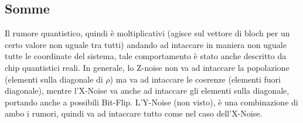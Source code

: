 \subsection{Somme}
Il rumore quantistico, quindi è moltiplicativi (agisce sul vettore di bloch per un certo valore non uguale tra tutti) andando ad intaccare in maniera non uguale tutte le coordinate del sistema, tale comportamento è stato anche descritto da chip quantistici reali.
In generale, lo Z-noise non va ad intaccare la popolazione (elementi sulla diagonale di \(\rho\)) ma va ad intaccare le coerenze (elementi fuori diagonale), mentre l'X-Noise va anche ad intaccare gli elementi sulla diagonale, portando anche a possibili Bit-Flip. L'Y-Noise (non visto), è una combinazione di ambo i rumori, quindi va ad intaccare tutto come nel caso dell'X-Noise.